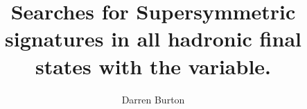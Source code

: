 \documentclass{mythesis}
\title{\LARGE{Searches for Supersymmetric signatures in all hadronic final states with the \alphat variable.}}
\author{Darren Burton \vspace*{0.5cm}}
\begin{document}
\runninglinenumbers

\begin{frontmatter}
  
\end{frontmatter}

\begin{mainmatter}
  
  
  
  
  
  
  
\end{mainmatter}

\begin{appendices}
  
\end{appendices}

\begin{backmatter}
  
\end{backmatter}

\end{document}
